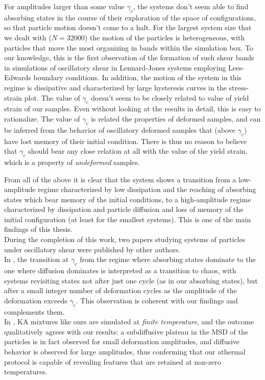 For amplitudes larger than some value $\gamma_{c}$, the systems don't seem able to find absorbing states in the course of their exploration of the space of configurations, so that particle motion doesn't come to a halt. For the largest system size that we dealt with ($N=32000$) the motion of the particles is heterogeneous, with particles that move the most organizing in bands within the simulation box. To our knowledge, this is the first observation of the formation of such shear bands in simulations of oscillatory shear in Lennard-Jones systems employing Lees-Edwards boundary conditions.
In addition, the motion of the system in this regime is dissipative and characterized by large hysteresis curves in the stress-strain plot.
The value of $\gamma_{c}$ doesn't seem to be closely related to value of yield strain of our samples. Even without looking at the results in detail, this is easy to rationalize. The value of $\gamma_{c}$ is related the properties of deformed samples, and can be inferred from the behavior of oscillatory deformed samples that (above $\gamma_{c}$) have lost memory of their initial condition. There is thus no reason to believe that $\gamma_{c}$ should bear any close relation at all with the value of the yield strain, which is a property of \emph{undeformed} samples.

From all of the above it is clear that the system shows a transition from a low-amplitude regime characterized by low dissipation and the reaching of absorbing states which bear memory of the initial conditions, to a high-amplitude regime characterized by dissipation and particle diffusion and loss of memory of the initial configuration (at least for the smallest systems).
This is one of the main findings of this thesis. \\
During the completion of this work, two papers studying systems of particles under oscillatory shear were published by other authors. \\
In \cite{regev2013onset}, the transition at $\gamma_{c}$ from the regime where absorbing states dominate to the one where diffusion dominates is interpreted as a transition to chaos, with systems revisiting states not after just one cycle (as in our absorbing states), but after a small integer number of deformation cycles as the amplitude of the deformation exceeds $\gamma_{c}$. This observation is coherent with our findings and complements them. \\
In \cite{priezjev2013heterogeneous}, KA mixtures like ours are simulated at \emph{finite temperature}, and the outcome qualitatively agrees with our results: a subdiffusive plateau in the MSD of the particles is in fact observed for small deformation amplitudes, and diffusive behavior is observed for large amplitudes, thus conferming that our athermal protocol is capable of revealing features that are retained at non-zero temperatures.

